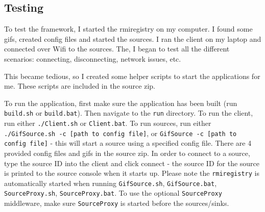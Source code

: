 \documentclass[a4paper]{article}
\begin{document}
\subsection{Testing}
To test the framework, I started the rmiregistry on my computer.
I found some gifs, created config files and started the sources.
I ran the client on my laptop and connected over Wifi to the sources.
The, I began to test all the different scenarios: connecting, disconnecting, network issues, etc.

This became tedious, so I created some helper scripts to start the applications for me.
These scripts are included in the source zip.

To run the application, first make sure the application has been built (run \texttt{build.sh} or \texttt{build.bat}).
Then navigate to the \texttt{run} directory.
To run the client, run either \texttt{./Client.sh} or \texttt{Client.bat}.
To run sources, run either \texttt{./GifSource.sh -c [path to config file]}, or \texttt{GifSource -c [path to config file]} - this will start a source using a specified config file.
There are 4 provided config files and gifs in the source zip.
In order to connect to a source, type the source ID into the client and click connect - the source ID for the source is printed to the source console when it starts up.
Please note the \texttt{rmiregistry} is automatically started when running \texttt{GifSource.sh}, \texttt{GifSource.bat}, \texttt{SourceProxy.sh}, \texttt{SourceProxy.bat}.
To use the optional \texttt{SourceProxy} middleware, make sure \texttt{SourceProxy} is started before the sources/sinks.

%
\end{document}

